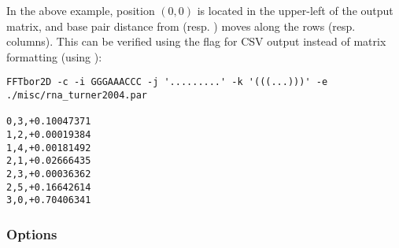 \documentclass[11pt]{article}
\begin{document}
In the above example, position $(0, 0)$ is located in the upper-left of the output matrix, and base pair distance from \A (resp. \B) moves along the rows (resp. columns). This can be verified using the  flag for CSV output instead of matrix formatting (using ):

\begin{verbatim}
FFTbor2D -c -i GGGAAACCC -j '.........' -k '(((...)))' -e ./misc/rna_turner2004.par

0,3,+0.10047371
1,2,+0.00019384
1,4,+0.00181492
2,1,+0.02666435
2,3,+0.00036362
2,5,+0.16642614
3,0,+0.70406341
\end{verbatim}

\subsubsection{Options} \label{subsub:fftboropt}

\end{document}
